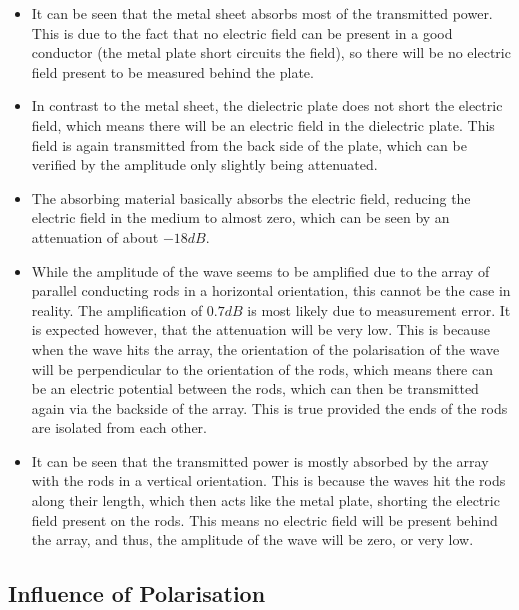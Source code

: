 \begin{itemize}
    \item It can be seen that the metal sheet absorbs most of the transmitted power. This is due to the fact that no electric field can be present in a good conductor (the metal plate short circuits the field), so there will be no electric field present to be measured behind the plate.
    
    \item In contrast to the metal sheet, the dielectric plate does not short the electric field, which means there will be an electric field in the dielectric plate. This field is again transmitted from the back side of the plate, which can be verified by the amplitude only slightly being attenuated.
    
    \item The absorbing material basically absorbs the electric field, reducing the electric field in the medium to almost zero, which can be seen by an attenuation of about $-18 dB$.
    
    \item While the amplitude of the wave seems to be amplified due to the array of parallel conducting rods in a horizontal orientation, this cannot be the case in reality. The amplification of $0.7dB$ is most likely due to measurement error. It is expected however, that the attenuation will be very low. This is because when the wave hits the array, the orientation of the polarisation of the wave will be perpendicular to the orientation of the rods, which means there can be an electric potential between the rods, which can then be transmitted again via the backside of the array. This is true provided the ends of the rods are isolated from each other.
    
    \item It can be seen that the transmitted power is mostly absorbed by the array with the rods in a vertical orientation. This is because the waves hit the rods along their length, which then acts like the metal plate, shorting the electric field present on the rods. This means no electric field will be present behind the array, and thus, the amplitude of the wave will be zero, or very low.
\end{itemize}

\subsection*{Influence of Polarisation}


